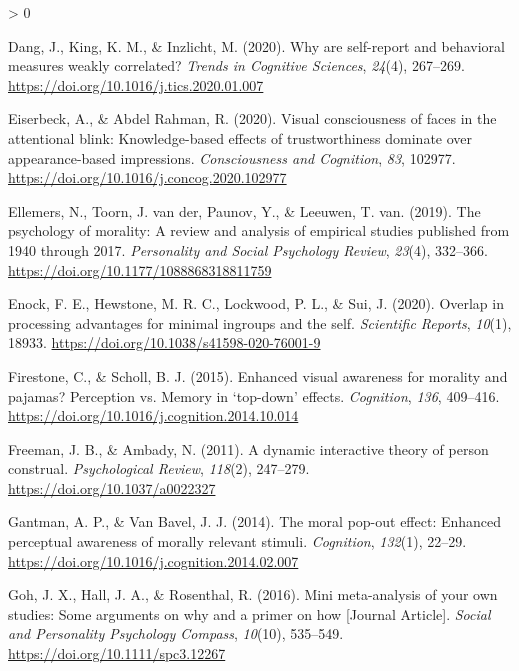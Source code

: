 \documentclass[
  english,
  man]{apa6}
\newlength{\cslhangindent}
\newenvironment{CSLReferences}[2] %
 {%
  \setlength{\parindent}{0pt}
  \ifodd #1 \everypar{\setlength{\hangindent}{\cslhangindent}}\ignorespaces\fi
  \ifnum #2 > 0
  \setlength{\parskip}{#2\baselineskip}
  \fi
 }%
 {}
\begin{document}
\begin{CSLReferences}{1}{0}
\leavevmode\hypertarget{ref-dang_why_2020}{}%
Dang, J., King, K. M., \& Inzlicht, M. (2020). Why are self-report and behavioral measures weakly correlated? \emph{Trends in Cognitive Sciences}, \emph{24}(4), 267--269. \url{https://doi.org/10.1016/j.tics.2020.01.007}

\leavevmode\hypertarget{ref-eiserbeck_visual_2020}{}%
Eiserbeck, A., \& Abdel Rahman, R. (2020). Visual consciousness of faces in the attentional blink: Knowledge-based effects of trustworthiness dominate over appearance-based impressions. \emph{Consciousness and Cognition}, \emph{83}, 102977. \url{https://doi.org/10.1016/j.concog.2020.102977}

\leavevmode\hypertarget{ref-ellemers_psychology_2019}{}%
Ellemers, N., Toorn, J. van der, Paunov, Y., \& Leeuwen, T. van. (2019). The psychology of morality: A review and analysis of empirical studies published from 1940 through 2017. \emph{Personality and Social Psychology Review}, \emph{23}(4), 332--366. \url{https://doi.org/10.1177/1088868318811759}

\leavevmode\hypertarget{ref-enock_overlap_2020}{}%
Enock, F. E., Hewstone, M. R. C., Lockwood, P. L., \& Sui, J. (2020). Overlap in processing advantages for minimal ingroups and the self. \emph{Scientific Reports}, \emph{10}(1), 18933. \url{https://doi.org/10.1038/s41598-020-76001-9}

\leavevmode\hypertarget{ref-firestone_enhanced_2015}{}%
Firestone, C., \& Scholl, B. J. (2015). Enhanced visual awareness for morality and pajamas? Perception vs. Memory in {`top-down'} effects. \emph{Cognition}, \emph{136}, 409--416. \url{https://doi.org/10.1016/j.cognition.2014.10.014}

\leavevmode\hypertarget{ref-freeman_dynamic_2011}{}%
Freeman, J. B., \& Ambady, N. (2011). A dynamic interactive theory of person construal. \emph{Psychological Review}, \emph{118}(2), 247--279. \url{https://doi.org/10.1037/a0022327}

\leavevmode\hypertarget{ref-gantman_moral_2014}{}%
Gantman, A. P., \& Van Bavel, J. J. (2014). The moral pop-out effect: Enhanced perceptual awareness of morally relevant stimuli. \emph{Cognition}, \emph{132}(1), 22--29. \url{https://doi.org/10.1016/j.cognition.2014.02.007}

\leavevmode\hypertarget{ref-Goh_2016_mini}{}%
Goh, J. X., Hall, J. A., \& Rosenthal, R. (2016). Mini meta-analysis of your own studies: Some arguments on why and a primer on how {[}Journal Article{]}. \emph{Social and Personality Psychology Compass}, \emph{10}(10), 535--549. \url{https://doi.org/10.1111/spc3.12267}


\end{CSLReferences}
\end{document}
